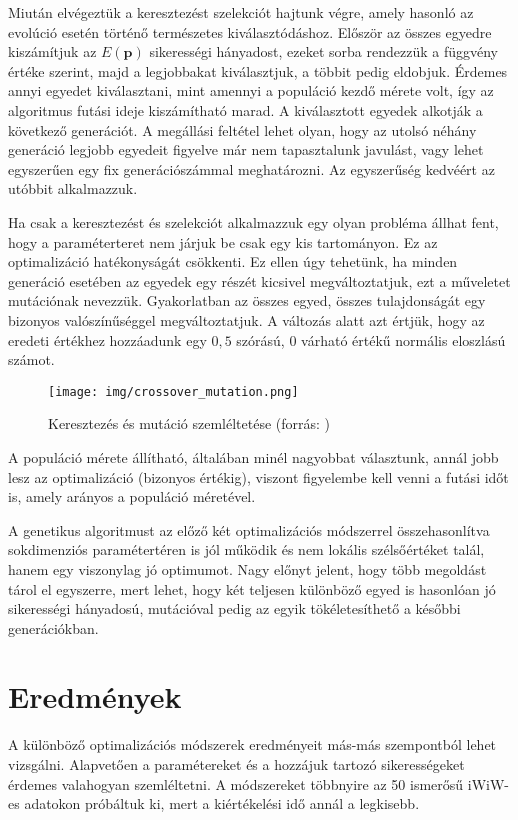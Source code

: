 \documentclass[12pt]{article}
\begin{document}
Miután elvégeztük a keresztezést szelekciót hajtunk végre, amely hasonló az evolúció esetén történő természetes kiválasztódáshoz. Először az összes egyedre kiszámítjuk az $E(\mathbf{p})$ sikerességi hányadost, ezeket sorba rendezzük a függvény értéke szerint, majd a legjobbakat kiválasztjuk, a többit pedig eldobjuk. Érdemes annyi egyedet kiválasztani, mint amennyi a populáció kezdő mérete volt, így az algoritmus futási ideje kiszámítható marad. A kiválasztott egyedek alkotják a következő generációt. A megállási feltétel lehet olyan, hogy az utolsó néhány generáció legjobb egyedeit figyelve már nem tapasztalunk javulást, vagy lehet egyszerűen egy fix generációszámmal meghatározni. Az egyszerűség kedvéért az utóbbit alkalmazzuk.

Ha csak a keresztezést és szelekciót alkalmazzuk egy olyan probléma állhat fent, hogy a paraméterteret nem járjuk be csak egy kis tartományon. Ez az optimalizáció hatékonyságát csökkenti. Ez ellen úgy tehetünk, ha minden generáció esetében az egyedek egy részét kicsivel megváltoztatjuk, ezt a műveletet mutációnak nevezzük. Gyakorlatban az összes egyed, összes tulajdonságát egy bizonyos valószínűséggel megváltoztatjuk. A változás alatt azt értjük, hogy az eredeti értékhez hozzáadunk egy $0{,}5$ szórású, $0$ várható értékű normális eloszlású számot. %

\begin{figure}[H]
	\centering
	\texttt{[image: img/crossover\_mutation.png]}
	\caption{Keresztezés és mutáció szemléltetése (forrás: \cite{genetic_cross-mutation})}
	\label{}
\end{figure}

A populáció mérete állítható, általában minél nagyobbat választunk, annál jobb lesz az optimalizáció (bizonyos értékig), viszont figyelembe kell venni a futási időt is, amely arányos a populáció méretével.

A genetikus algoritmust az előző két optimalizációs módszerrel összehasonlítva sokdimenziós paramétertéren is jól működik és nem lokális szélsőértéket talál, hanem egy viszonylag jó optimumot. Nagy előnyt jelent, hogy több megoldást tárol el egyszerre, mert lehet, hogy két teljesen különböző egyed is hasonlóan jó sikerességi hányadosú, mutációval pedig az egyik tökéletesíthető a későbbi generációkban.

\section{Eredmények}
A különböző optimalizációs módszerek eredményeit más-más szempontból lehet vizsgálni. Alapvetően a paramétereket és a hozzájuk tartozó sikerességeket érdemes valahogyan szemléltetni. A módszereket többnyire az 50 ismerősű iWiW-es adatokon próbáltuk ki, mert a kiértékelési idő annál a legkisebb.
\end{document}
